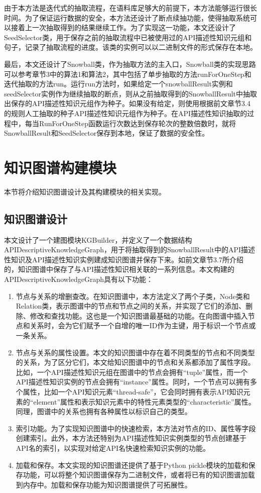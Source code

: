 由于本方法是迭代式的抽取流程，在语料库足够大的前提下，本方法能够运行很长时间。为了保证运行数据的安全，本方法还设计了断点续抽功能，使得抽取系统可以接着上一次抽取得到的结果继续工作。为了实现这一功能，本文还设计了SeedSelector类，用于保存之前的抽取流程中已被使用过的API描述性知识元组和句子，记录了抽取流程的进度。该类的实例可以以二进制文件的形式保存在本地。

最后，本文还设计了Snowball类，作为抽取方法的主入口，Snowball类的实现思路可以参考章节3中的算法1和算法2，其中包括了单步抽取的方法runForOneStep和迭代抽取的方法run。运行run方法时，如果给定一个snowballResult实例和seedSelector实例作为继续抽取的断点，则从之前抽取得到的SnowballResult中抽取出保存的API描述性知识元组作为种子。如果没有给定，则使用根据前文章节3.4的规则人工抽取的种子API描述性知识元组作为种子。在API描述性知识抽取的过程中，每当RunForOneStep函数运行次数达到保存轮次的整数倍数时，就将SnowballResult和SeedSelector保存到本地，保证了数据的安全性。

\section{知识图谱构建模块}
本节将介绍知识图谱设计及其构建模块的相关实现。
\subsection{知识图谱设计}
本文设计了一个建图模块KGBuilder，并定义了一个数据结构APIDescriptiveKnowledgeGraph，用于将抽取得到的SnowballResult中的API描述性知识及API描述性知识实例建成知识图谱并保存下来。如前文章节3.7所介绍的，知识图谱中保存了与API描述性知识相关联的一系列信息。本文构建的APIDescriptiveKnowledgeGraph具有以下功能：

\begin{enumerate}
    \item 节点与关系的增删查改。在知识图谱中，本方法定义了两个子类，Node类和Relation类，表示图谱中的节点和节点之间的关系，并实现了它们的添加、删除、修改和查找功能。这也是一个知识图谱最基础的功能。在向图谱中插入节点和关系时，会为它们赋予一个自增的唯一ID作为主键，用于标识一个节点或一条关系。
    \item 节点与关系的属性设置。本文的知识图谱中存在着不同类型的节点和不同类型的关系，为了区分它们，本文给知识图谱中的节点和关系都添加了属性字段。比如，一个API描述性知识元组在图谱中的节点会拥有“tuple”属性，而一个API描述性知识实例的节点会拥有“instance”属性。同时，一个节点可以拥有多个属性，比如一个API知识元素“thread-safe”，它会同时拥有表示API知识元素的“element”属性和表示知识元素中的特性元素类型的“characteristic”属性。同理，图谱中的关系也拥有各种属性以标识自己的类型。
    \item 索引功能。为了实现知识图谱中的快速检索，本方法对节点的ID、属性等字段创建索引。此外，本方法还特别为API描述性知识实例类型的节点创建基于API名的索引，以实现对给定API名快速检索知识实例的功能。
    \item 加载和保存。本文实现的知识图谱还提供了基于Python pickle模块的加载和保存功能，可以将整个知识图谱保存为二进制文件，或者将已有的知识图谱加载到内存中。加载和保存功能为知识图谱提供了可拓展性。
\end{enumerate}

